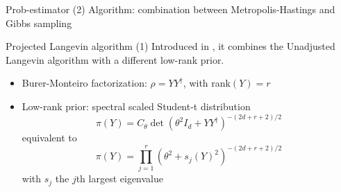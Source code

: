 \documentclass{beamer}
\begin{document}
\begin{frame}{Prob-estimator (2)}
    Algorithm: combination between Metropolis-Hastings and Gibbs sampling\medbreak
    
\begin{algorithm}[H]

    \DontPrintSemicolon


    \caption{Prob-estimator algorithm}

\end{algorithm}\medbreak

\end{frame}
\begin{frame}{Projected Langevin algorithm (1)}
    Introduced in \cite{ACMT2024}, it combines the Unadjusted Langevin algorithm with a different low-rank prior.
    \begin{itemize}
        \item Burer-Monteiro factorization: $\rho = YY^\dagger$, with rank$(Y)=r$ 
        \item Low-rank prior: spectral scaled Student-t distribution
        \begin{equation}
            \pi(Y) = C_\theta \det(\theta^2I_d + YY^\dagger)^{-(2d+r+2)/2}
        \end{equation}
        equivalent to 
        \begin{equation}
            \pi(Y) = \prod_{j=1}^r (\theta^2 + s_j(Y)^2)^{-(2d+r+2)/2}
        \end{equation}
        with $s_j$ the $j$th largest eigenvalue
    \end{itemize} 
\end{frame}
\end{document}
